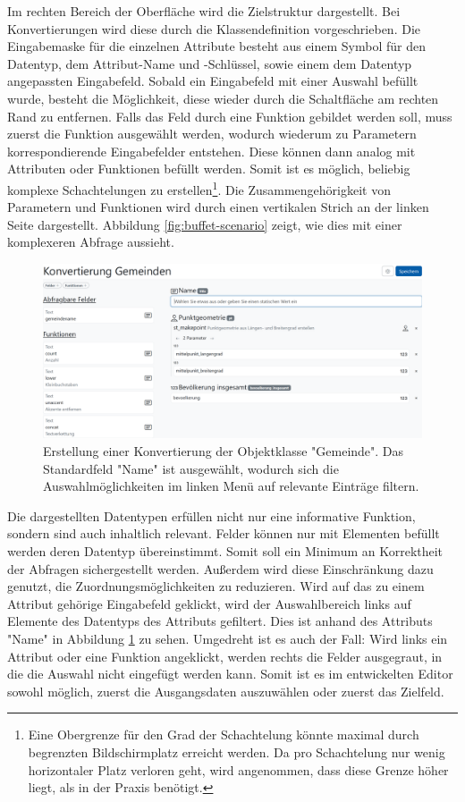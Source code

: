 Im rechten Bereich der Oberfläche wird die Zielstruktur dargestellt. Bei Konvertierungen wird diese durch die Klassendefinition vorgeschrieben. Die Eingabemaske für die einzelnen Attribute besteht aus einem Symbol für den Datentyp, dem Attribut-Name und -Schlüssel, sowie einem dem Datentyp angepassten Eingabefeld. Sobald ein Eingabefeld mit einer Auswahl befüllt wurde, besteht die Möglichkeit, diese wieder durch die Schaltfläche am rechten Rand zu entfernen. Falls das Feld durch eine Funktion gebildet werden soll, muss zuerst die Funktion ausgewählt werden, wodurch wiederum zu Parametern korrespondierende Eingabefelder entstehen. Diese können dann analog mit Attributen oder Funktionen befüllt werden. Somit ist es möglich, beliebig komplexe Schachtelungen zu erstellen\footnote{Eine Obergrenze für den Grad der Schachtelung könnte maximal durch begrenzten Bildschirmplatz erreicht werden. Da pro Schachtelung nur wenig horizontaler Platz verloren geht, wird angenommen, dass diese Grenze höher liegt, als in der Praxis benötigt.}. Die Zusammengehörigkeit von Parametern und Funktionen wird durch einen vertikalen Strich an der linken Seite dargestellt. Abbildung \ref{fig:buffet-scenario} zeigt, wie dies mit einer komplexeren Abfrage aussieht.

\begin{figure}[ht]
  \begin{center}
    \includegraphics[width=.95\textwidth]{assets/buffet-selected.png}
  \end{center}
  \caption{Erstellung einer Konvertierung der Objektklasse "Gemeinde". Das Standardfeld "Name" ist ausgewählt, wodurch sich die Auswahlmöglichkeiten im linken Menü auf relevante Einträge filtern.}
  \label{fig:buffet-selected}
\end{figure}

Die dargestellten Datentypen erfüllen nicht nur eine informative Funktion, sondern sind auch inhaltlich relevant. Felder können nur mit Elementen befüllt werden deren Datentyp übereinstimmt. Somit soll ein Minimum an Korrektheit der Abfragen sichergestellt werden. Außerdem wird diese Einschränkung dazu genutzt, die Zuordnungsmöglichkeiten zu reduzieren. Wird auf das zu einem Attribut gehörige Eingabefeld geklickt, wird der Auswahlbereich links auf Elemente des Datentyps des Attributs gefiltert. Dies ist anhand des Attributs "Name" in Abbildung \ref{fig:buffet-selected} zu sehen. Umgedreht ist es auch der Fall: Wird links ein Attribut oder eine Funktion angeklickt, werden rechts die Felder ausgegraut, in die die Auswahl nicht eingefügt werden kann. Somit ist es im entwickelten Editor sowohl möglich, zuerst die Ausgangsdaten auszuwählen oder zuerst das Zielfeld.

